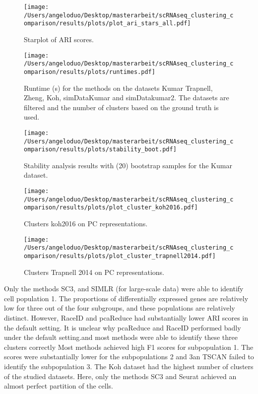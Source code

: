 \documentclass[11pt, a4paper]{article}\usepackage[]{graphicx}\usepackage[]{color}
\begin{document}
\begin{figure}[!h]
\texttt{[image: /Users/angeloduo/Desktop/masterarbeit/scRNAseq\_clustering\_comparison/results/plots/plot\_ari\_stars\_all.pdf]}
\caption{Starplot of ARI scores.  }
\label{fig:arirank}
\end{figure}


\begin{figure}[!h]
\texttt{[image: /Users/angeloduo/Desktop/masterarbeit/scRNAseq\_clustering\_comparison/results/plots/runtimes.pdf]}
\caption{Runtime (s) for the methods on the datasets Kumar Trapnell, Zheng, Koh, simDataKumar and simDatakumar2. The datasets are filtered and the number of clusters based on the ground truth is used.}
\label{fig:runtime}
\end{figure}



\begin{figure}[!h]
\texttt{[image: /Users/angeloduo/Desktop/masterarbeit/scRNAseq\_clustering\_comparison/results/plots/stability\_boot.pdf]}
\caption{Stability analysis results with (20) bootstrap samples for the Kumar dataset.}
\label{fig:boot}
\end{figure}


\begin{figure}[!h]
\texttt{[image: /Users/angeloduo/Desktop/masterarbeit/scRNAseq\_clustering\_comparison/results/plots/plot\_cluster\_koh2016.pdf]}
\caption{Clusters koh2016 on PC representations. }
\label{fig:clusterkoh}
\end{figure}



\begin{figure}[!h]
\texttt{[image: /Users/angeloduo/Desktop/masterarbeit/scRNAseq\_clustering\_comparison/results/plots/plot\_cluster\_trapnell2014.pdf]}
\caption{ Clusters Trapnell 2014 on PC representations. }
\label{fig:clustertrapnell}
\end{figure}
\newpage


Only the methods SC3, and SIMLR (for large-scale data) were able to identify cell population 1. 
The proportions of differentially expressed genes are relatively low for three out of the four subgroups, and these populations are relatively distinct. 
However, RaceID and pcaReduce had substantially lower ARI scores in the default setting.  It is unclear why pcaReduce and RaceID performed badly under the default setting.and most methods were able to identify these three clusters correctly
 Most methods achieved high F1 scores for subpopulation 1. The scores were substantially lower for the subpopulations 2 and 3an  TSCAN failed to identify the subpopulation 3.
The Koh dataset had the highest number of clusters of the studied datasets.  Here, only the methods SC3 and Seurat achieved an almost perfect partition of the cells.  
\end{document}
